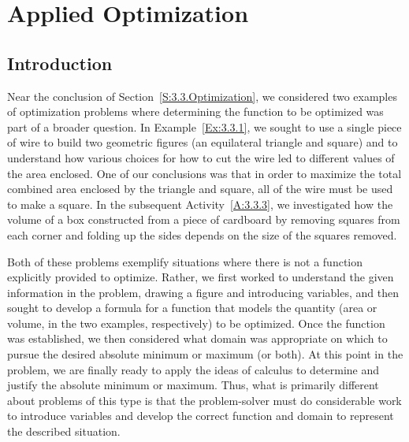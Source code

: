 \section{Applied Optimization} \label{S:3.4.AppliedOpt}

\vspace*{-14 pt}

\subsection*{Introduction}

Near the conclusion of Section~\ref{S:3.3.Optimization}, we considered two examples of optimization problems where determining the function to be optimized was part of a broader question.  In Example~\ref{Ex:3.3.1}, we sought to use a single piece of wire to build two geometric figures (an equilateral triangle and square) and to understand how various choices for how to cut the wire led to different values of the area enclosed.  One of our conclusions was that in order to maximize the total combined area enclosed by the triangle and square, all of the wire must be used to make a square.  In the subsequent Activity~\ref{A:3.3.3}, we investigated how the volume of a box constructed from a piece of cardboard by removing squares from each corner and folding up the sides depends on the size of the squares removed.

Both of these problems exemplify situations where there is not a function explicitly provided to optimize.  Rather, we first worked to understand the given information in the problem, drawing a figure and introducing variables, and then sought to develop a formula for a function that models the quantity (area or volume, in the two examples, respectively) to be optimized.  Once the function was established, we then considered what domain was appropriate on which to pursue the desired absolute minimum or maximum (or both).  At this point in the problem, we are finally ready to apply the ideas of calculus to determine and justify the absolute minimum or maximum.  Thus, what is primarily different about problems of this type is that the problem-solver must do considerable work to introduce variables and develop the correct function and domain to represent the described situation. 

